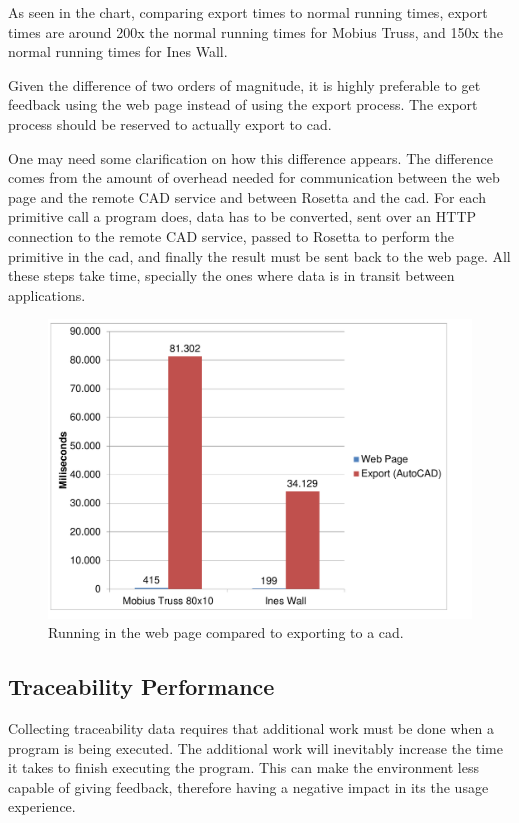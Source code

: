 As seen in the chart, comparing export times to normal running times, export times are around 200x the normal running times for Mobius Truss, and 150x the normal running times for Ines Wall.

Given the difference of two orders of magnitude, it is highly preferable to get feedback using the web page instead of using the export process.
The export process should be reserved to actually export to \gls{cad}.

One may need some clarification on how this difference appears.
The difference comes from the amount of overhead needed for communication between the web page and the remote CAD service and between Rosetta and the \gls{cad}.
For each primitive call a program does, data has to be converted, sent over an HTTP connection to the remote CAD service, passed to Rosetta to perform the primitive in the \gls{cad}, and finally the result must be sent back to the web page.
All these steps take time, specially the ones where data is in transit between applications.

\begin{figure}
  \centering
  \includegraphics[width=12cm]{./images/local_remote_timing}
  \caption{Running in the web page compared to exporting to a \gls{cad}.}
  \label{fig:local:remote:timing}
\end{figure}


\subsection{Traceability Performance}
Collecting traceability data requires that additional work must be done when a program is being executed.
The additional work will inevitably increase the time it takes to finish executing the program.
This can make the environment less capable of giving feedback, therefore having a negative impact in its the usage experience.

